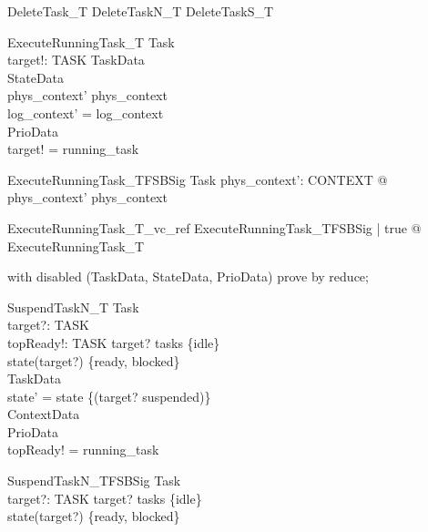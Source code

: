 \documentclass[a4paper, 12pt]{article}
\begin{document}
\begin{zed}
DeleteTask\_T  DeleteTaskN\_T \lor DeleteTaskS\_T
\end{zed}

\begin{schema}{ExecuteRunningTask\_T}
  \Delta Task\\
  target!: TASK
\where
  \Xi TaskData\\
  \Xi StateData\\
  phys\_context' \neq  phys\_context\\
  log\_context' = log\_context\\
  \Xi PrioData\\
  target! = running\_task
\end{schema}

\begin{schema}{ExecuteRunningTask\_TFSBSig}
  Task
\where
  \exists  phys\_context': CONTEXT @ phys\_context' \neq  phys\_context
\end{schema}

\begin{theorem}{ExecuteRunningTask\_T\_vc\_ref}
\forall  ExecuteRunningTask\_TFSBSig | true @ \pre  ExecuteRunningTask\_T
\end{theorem}

\begin{zproof}
with disabled (TaskData, StateData, PrioData) prove by reduce;
\end{zproof}

\begin{schema}{SuspendTaskN\_T}
  \Delta Task\\
  target?: TASK\\
  topReady!: TASK
\where
  target? \in  tasks \setminus  \{idle\}\\
  state(target?) \in  \{ready, blocked\}\\
  \Xi TaskData\\
  state' = state \oplus  \{(target? \mapsto  suspended)\}\\
  \Xi ContextData\\
  \Xi PrioData\\
  topReady! = running\_task
\end{schema}

\begin{schema}{SuspendTaskN\_TFSBSig}
  Task\\
  target?: TASK
\where
  target? \in  tasks \setminus  \{idle\}\\
  state(target?) \in  \{ready, blocked\}
\end{schema}
\end{document}
